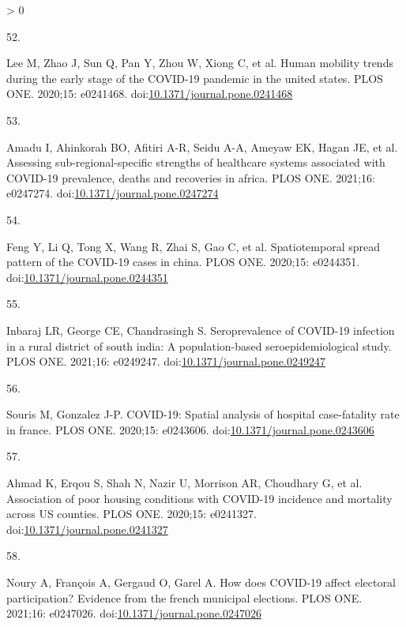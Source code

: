 \documentclass[10pt,letterpaper]{article}
\newlength{\csllabelwidth}
\newlength{\cslhangindent}
\newenvironment{CSLReferences}[3] %
 {%
  \setlength{\parindent}{0pt}
  \ifodd #1 \everypar{\setlength{\hangindent}{\cslhangindent}}\ignorespaces\fi
  \ifnum #2 > 0
  \setlength{\parskip}{#2\baselineskip}
  \fi
 }%
 {}
\newcommand{\CSLLeftMargin}[1]{\parbox[t]{\csllabelwidth}{#1}}
\newcommand{\CSLRightInline}[1]{\parbox[t]{\linewidth - \csllabelwidth}{#1}}
\begin{document}
\begin{CSLReferences}{0}{0}
\leavevmode\hypertarget{ref-Lee2020human}{}%
\CSLLeftMargin{52. }
\CSLRightInline{Lee M, Zhao J, Sun Q, Pan Y, Zhou W, Xiong C, et al.
Human mobility trends during the early stage of the COVID-19 pandemic in
the united states. PLOS ONE. 2020;15: e0241468.
doi:\href{https://doi.org/10.1371/journal.pone.0241468}{10.1371/journal.pone.0241468}}

\leavevmode\hypertarget{ref-Amadu2021assessing}{}%
\CSLLeftMargin{53. }
\CSLRightInline{Amadu I, Ahinkorah BO, Afitiri A-R, Seidu A-A, Ameyaw
EK, Hagan JE, et al. Assessing sub-regional-specific strengths of
healthcare systems associated with COVID-19 prevalence, deaths and
recoveries in africa. PLOS ONE. 2021;16: e0247274.
doi:\href{https://doi.org/10.1371/journal.pone.0247274}{10.1371/journal.pone.0247274}}

\leavevmode\hypertarget{ref-Feng2020spread}{}%
\CSLLeftMargin{54. }
\CSLRightInline{Feng Y, Li Q, Tong X, Wang R, Zhai S, Gao C, et al.
Spatiotemporal spread pattern of the COVID-19 cases in china. PLOS ONE.
2020;15: e0244351.
doi:\href{https://doi.org/10.1371/journal.pone.0244351}{10.1371/journal.pone.0244351}}

\leavevmode\hypertarget{ref-Inbaraj2021seroprevalence}{}%
\CSLLeftMargin{55. }
\CSLRightInline{Inbaraj LR, George CE, Chandrasingh S. Seroprevalence of
COVID-19 infection in a rural district of south india: A
population-based seroepidemiological study. PLOS ONE. 2021;16: e0249247.
doi:\href{https://doi.org/10.1371/journal.pone.0249247}{10.1371/journal.pone.0249247}}

\leavevmode\hypertarget{ref-Souris2020covid}{}%
\CSLLeftMargin{56. }
\CSLRightInline{Souris M, Gonzalez J-P. COVID-19: Spatial analysis of
hospital case-fatality rate in france. PLOS ONE. 2020;15: e0243606.
doi:\href{https://doi.org/10.1371/journal.pone.0243606}{10.1371/journal.pone.0243606}}

\leavevmode\hypertarget{ref-Ahmad2020association}{}%
\CSLLeftMargin{57. }
\CSLRightInline{Ahmad K, Erqou S, Shah N, Nazir U, Morrison AR,
Choudhary G, et al. Association of poor housing conditions with COVID-19
incidence and mortality across US counties. PLOS ONE. 2020;15: e0241327.
doi:\href{https://doi.org/10.1371/journal.pone.0241327}{10.1371/journal.pone.0241327}}

\leavevmode\hypertarget{ref-Noury2021how}{}%
\CSLLeftMargin{58. }
\CSLRightInline{Noury A, François A, Gergaud O, Garel A. How does
COVID-19 affect electoral participation? Evidence from the french
municipal elections. PLOS ONE. 2021;16: e0247026.
doi:\href{https://doi.org/10.1371/journal.pone.0247026}{10.1371/journal.pone.0247026}}


\end{CSLReferences}
\end{document}
